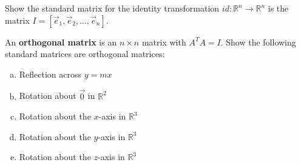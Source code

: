 \begin{exercise}
Show the standard matrix for the identity transformation 
$id:\mathbb{R}^n \to \mathbb{R}^n$ is the matrix $I=[\vec{e}_1, \vec{e}_2, \ldots, \vec{e}_n]$.
\end{exercise}

\begin{exercise} An \textbf{orthogonal matrix} is an $n \times n$ matrix with 
$A^TA=I$. Show the following standard matrices are orthogonal matrices:
\begin{enumerate}[a.)]
\item Reflection across $y=mx$
\item Rotation about $\vec{0}$ in $\mathbb{R}^2$
\item Rotation about the $x$-axis in $\mathbb{R}^3$
\item Rotation about the $y$-axis in $\mathbb{R}^3$
\item Rotation about the $z$-axis in $\mathbb{R}^3$
\end{enumerate}
\end{exercise}

